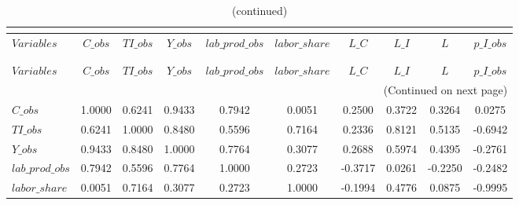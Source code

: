  
\begin{center}
\begin{longtable}{lccccccccc} 
\caption{MATRIX OF CORRELATIONS}\\
 \label{Table:th_corr_matrix}\\
\toprule 
$Variables       $	 & 	 $           C\_obs$	 & 	 $          TI\_obs$	 & 	 $           Y\_obs$	 & 	 $  lab\_prod\_obs$	 & 	 $     labor\_share$	 & 	 $             L\_C$	 & 	 $             L\_I$	 & 	 $                 L$	 & 	 $       p\_I\_obs$\\
\midrule \endfirsthead 
\caption{(continued)}\\
 \toprule \\ 
$Variables       $	 & 	 $           C\_obs$	 & 	 $          TI\_obs$	 & 	 $           Y\_obs$	 & 	 $  lab\_prod\_obs$	 & 	 $     labor\_share$	 & 	 $             L\_C$	 & 	 $             L\_I$	 & 	 $                 L$	 & 	 $       p\_I\_obs$\\
\midrule \endhead 
\midrule \multicolumn{10}{r}{(Continued on next page)} \\ \bottomrule \endfoot 
\bottomrule \endlastfoot 
$C\_obs          $	 & 	            1.0000	 & 	            0.6241	 & 	            0.9433	 & 	            0.7942	 & 	            0.0051	 & 	            0.2500	 & 	            0.3722	 & 	            0.3264	 & 	            0.0275 \\ 
$TI\_obs         $	 & 	            0.6241	 & 	            1.0000	 & 	            0.8480	 & 	            0.5596	 & 	            0.7164	 & 	            0.2336	 & 	            0.8121	 & 	            0.5135	 & 	           -0.6942 \\ 
$Y\_obs          $	 & 	            0.9433	 & 	            0.8480	 & 	            1.0000	 & 	            0.7764	 & 	            0.3077	 & 	            0.2688	 & 	            0.5974	 & 	            0.4395	 & 	           -0.2761 \\ 
$lab\_prod\_obs  $	 & 	            0.7942	 & 	            0.5596	 & 	            0.7764	 & 	            1.0000	 & 	            0.2723	 & 	           -0.3717	 & 	            0.0261	 & 	           -0.2250	 & 	           -0.2482 \\ 
$labor\_share    $	 & 	            0.0051	 & 	            0.7164	 & 	            0.3077	 & 	            0.2723	 & 	            1.0000	 & 	           -0.1994	 & 	            0.4776	 & 	            0.0875	 & 	           -0.9995 \\ 

\end{longtable}
\end{center}
